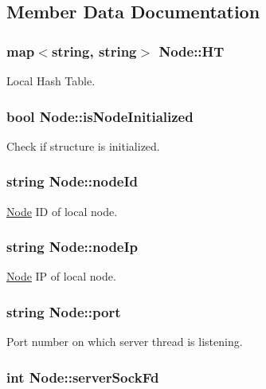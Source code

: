 \subsection{Member Data Documentation}
\hypertarget{classNode_aef05ed03e2d587ae1761c7dc4a1ad213}{
\subsubsection[{H\-T}]{\setlength{\rightskip}{0pt plus 5cm}map$<$string, string$>$ Node\-::\-H\-T}}\label{classNode_aef05ed03e2d587ae1761c7dc4a1ad213}
Local Hash Table. \hypertarget{classNode_ab125f5f050074e2dae467832069b9414}{
\subsubsection[{is\-Node\-Initialized}]{\setlength{\rightskip}{0pt plus 5cm}bool Node\-::is\-Node\-Initialized}}\label{classNode_ab125f5f050074e2dae467832069b9414}
Check if structure is initialized. \hypertarget{classNode_a709c164657057a32cc79dd7a256ed744}{
\subsubsection[{node\-Id}]{\setlength{\rightskip}{0pt plus 5cm}string Node\-::node\-Id}}\label{classNode_a709c164657057a32cc79dd7a256ed744}
\hyperlink{classNode}{Node} I\-D of local node. \hypertarget{classNode_a59879ea3bcabb0ea5211dffcfbf49b73}{
\subsubsection[{node\-Ip}]{\setlength{\rightskip}{0pt plus 5cm}string Node\-::node\-Ip}}\label{classNode_a59879ea3bcabb0ea5211dffcfbf49b73}
\hyperlink{classNode}{Node} I\-P of local node. \hypertarget{classNode_adcf35fc0482227d0b62df69b685b94da}{
\subsubsection[{port}]{\setlength{\rightskip}{0pt plus 5cm}string Node\-::port}}\label{classNode_adcf35fc0482227d0b62df69b685b94da}
Port number on which server thread is listening. \hypertarget{classNode_a368d0971e95e5481cb17ce82145098bd}{
\subsubsection[{server\-Sock\-Fd}]{\setlength{\rightskip}{0pt plus 5cm}int Node\-::server\-Sock\-Fd}}\label{classNode_a368d0971e95e5481cb17ce82145098bd}
